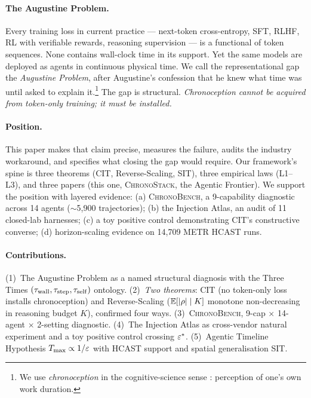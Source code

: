 \documentclass[letterpaper]{article}
\begin{document}
\paragraph{The Augustine Problem.}
Every training loss in current practice --- next-token cross-entropy, SFT, RLHF, RL with verifiable rewards, reasoning supervision --- is a functional of token sequences. None contains wall-clock time in its support. Yet the same models are deployed as agents in continuous physical time. We call the representational gap the \emph{Augustine Problem}, after Augustine's confession that he knew what time was until asked to explain it.\footnote{We use \emph{chronoception} in the cognitive-science sense \citep{wittmann2009chronoception,eagleman2008time}: perception of one's own work duration.} The gap is structural. \emph{Chronoception cannot be acquired from token-only training; it must be installed.}

\paragraph{Position.} This paper makes that claim precise, measures the failure, audits the industry workaround, and specifies what closing the gap would require. Our framework's spine is three theorems (CIT, Reverse-Scaling, SIT), three empirical laws (L1--L3), and three papers (this one, \textsc{ChronoStack}, the Agentic Frontier). We support the position with layered evidence: (a) \textsc{ChronoBench}, a 9-capability diagnostic across 14 agents ($\sim$5,900 trajectories); (b) the Injection Atlas, an audit of 11 closed-lab harnesses; (c) a toy positive control demonstrating CIT's constructive converse; (d) horizon-scaling evidence on 14,709 METR HCAST runs.

\paragraph{Contributions.}
(1)~The Augustine Problem as a named structural diagnosis with the Three Times $(\tau_{\mathrm{wall}}, \tau_{\mathrm{step}}, \tau_{\mathrm{self}})$ ontology. (2)~\emph{Two theorems}: CIT (no token-only loss installs chronoception) and Reverse-Scaling ($\mathbb{E}[|\rho| \mid K]$ monotone non-decreasing in reasoning budget $K$), confirmed four ways. (3)~\textsc{ChronoBench}, 9-cap $\times$ 14-agent $\times$ 2-setting diagnostic. (4)~The Injection Atlas as cross-vendor natural experiment and a toy positive control crossing $\varepsilon^{*}$. (5)~Agentic Timeline Hypothesis $T_{\max} \propto 1/\varepsilon$ with HCAST support and spatial generalisation SIT.
\end{document}
